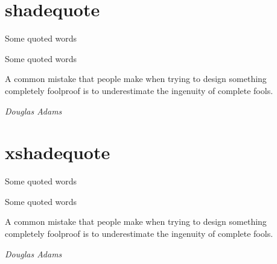 \documentclass[12pt]{article}
\begin{document}
\section{shadequote}

\begin{shadequote}
	Some quoted words
\end{shadequote}

\begin{shadequote*}
	Some quoted words
\end{shadequote*}

\begin{shadequote}
	A common mistake that people make when trying
	to design something completely foolproof is
	to underestimate the ingenuity of complete fools.

	\par \hfill{} \emph{Douglas Adams}
\end{shadequote}

\lipsum[1]


\section{xshadequote}

\begin{xshadequote}
	Some quoted words
\end{xshadequote}

\begin{xshadequote*}
	Some quoted words
\end{xshadequote*}

\begin{xshadequote}
	A common mistake that people make when trying
	to design something completely foolproof is
	to underestimate the ingenuity of complete fools.

	\par \hfill{} \emph{Douglas Adams}
\end{xshadequote}

\lipsum[1]
\end{document}
